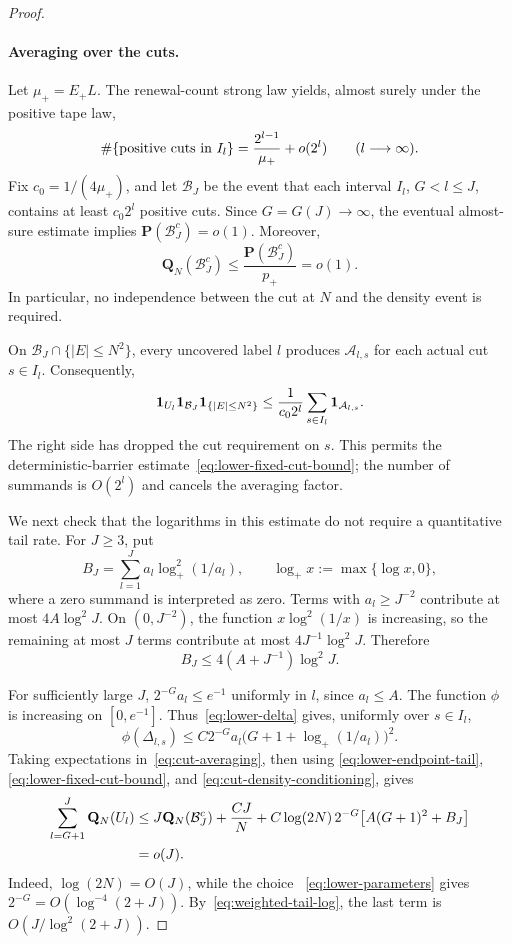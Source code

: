 \begin{proof}
\paragraph{Averaging over the cuts.}
Let $\mu_+=E_+L$.  The renewal-count strong law yields, almost surely
under the positive tape law,
\[
 \#\{\hbox{positive cuts in }I_l\}
 =\frac{2^{l-1}}{\mu_+}+o(2^l)
 \qquad(l\longrightarrow\infty).
\]
Fix $c_0=1/(4\mu_+)$, and let $\mathcal B_J$ be the event that
each interval $I_l$, $G<l\le J$, contains at least $c_0 2^l$
positive cuts.  Since $G=G(J)\to\infty$, the eventual almost-sure
estimate implies $\mathbf P(\mathcal B_J^c)=o(1)$.  Moreover,
\begin{equation}\label{eq:cut-density-conditioning}
 \mathbf Q_N(\mathcal B_J^c)
 \le \frac{\mathbf P(\mathcal B_J^c)}{p_+}=o(1).
\end{equation}
In particular, no independence between the cut at $N$ and the density
event is required.

On $\mathcal B_J\cap\{|E|\le N^2\}$, every uncovered label $l$
produces $\mathcal A_{l,s}$ for each actual cut $s\in I_l$.
Consequently,
\begin{equation}\label{eq:cut-averaging}
 \mathbf 1_{U_l}\mathbf 1_{\mathcal B_J}\mathbf 1_{\{|E|\le N^2\}}
 \le \frac1{c_0 2^l}\sum_{s\in I_l}\mathbf 1_{\mathcal A_{l,s}}.
\end{equation}
The right side has dropped the cut requirement on $s$.  This permits
the deterministic-barrier estimate~\eqref{eq:lower-fixed-cut-bound};
the number of summands is $O(2^l)$ and cancels the averaging factor.

We next check that the logarithms in this estimate do not require a
quantitative tail rate.  For $J\ge3$, put
\[
 B_J=\sum_{l=1}^J a_l\log_+^2(1/a_l),
 \qquad \log_+x:=\max\{\log x,0\},
\]
where a zero summand is interpreted as zero.  Terms with
$a_l\ge J^{-2}$ contribute at most $4A\log^2 J$.  On
$(0,J^{-2})$, the function $x\log^2(1/x)$ is increasing, so the
remaining at most $J$ terms contribute at most $4J^{-1}\log^2 J$.
Therefore
\begin{equation}\label{eq:weighted-tail-log}
 B_J\le 4(A+J^{-1})\log^2 J.
\end{equation}

For sufficiently large $J$, $2^{-G}a_l\le e^{-1}$ uniformly in
$l$, since $a_l\le A$.  The function $\phi$ is increasing on
$[0,e^{-1}]$.  Thus~\eqref{eq:lower-delta} gives, uniformly over
$s\in I_l$,
\[
 \phi(\Delta_{l,s})\le C2^{-G}a_l
 \bigl(G+1+\log_+(1/a_l)\bigr)^2.
\]
Taking expectations in~\eqref{eq:cut-averaging}, then using
\eqref{eq:lower-endpoint-tail},
\eqref{eq:lower-fixed-cut-bound}, and
\eqref{eq:cut-density-conditioning}, gives
\begin{align}
 \sum_{l=G+1}^J\mathbf Q_N(U_l)
 &\le J\mathbf Q_N(\mathcal B_J^c)+\frac{CJ}{N}
   +C\log(2N)\,2^{-G}\bigl[A(G+1)^2+B_J\bigr]\notag\\
 &=o(J).
 \label{eq:few-uncovered}
\end{align}
Indeed, $\log(2N)=O(J)$, while the choice~
\eqref{eq:lower-parameters} gives
$2^{-G}=O(\log^{-4}(2+J))$.  By~\eqref{eq:weighted-tail-log},
the last term is $O(J/\log^2(2+J))$.


\end{proof}
